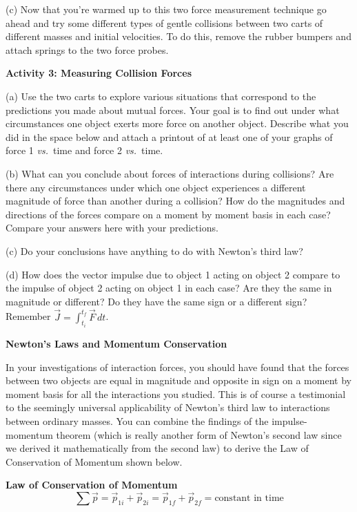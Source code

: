(c) Now that you're warmed up to this two force measurement technique go ahead and
try some different types of gentle collisions between two carts of different
masses and initial velocities. To do this, remove the rubber bumpers and attach springs to the two force probes.

\pagebreak[3]
\textbf{Activity 3: Measuring Collision Forces }

(a) Use the two carts to explore various situations that correspond to the predictions
you made about mutual forces. Your goal is to find out under what circumstances
one object exerts more force on another object. Describe what you did in the
space below and attach a printout of at least one of your graphs of force 1 \textit{vs.}~time and force 2 \textit{vs.}~time.
\answerspace{30mm}

(b) What can you conclude about forces of interactions during collisions? Are there any circumstances under which one object experiences a different magnitude of force
than another during a collision? How do the magnitudes and directions of the
forces compare on a moment by moment basis in each case? 
Compare your answers here with your predictions.
\answerspace{30mm}

(c) Do your conclusions have anything to do with Newton's third law?
\answerspace{20mm}

\pagebreak[2]
(d) How does the vector impulse due to object 1 acting on object 2 compare to
the impulse of object 2 acting on object 1 in each case? Are they the same in
magnitude or different? Do they have the same sign or a different sign? Remember
\( {\vec  J}=\int _{t_{i}}^{t_{f}}{\vec  F}\,dt \).
\answerspace{20mm}

\textbf{Newton's Laws and Momentum Conservation} 

In your investigations of interaction forces, you should have found that the
forces between two objects are equal in magnitude and opposite in sign on a
moment by moment basis for all the interactions you studied. This is of course
a testimonial to the seemingly universal applicability of Newton's third law
to interactions between ordinary masses. You can combine the findings of the
impulse-momentum theorem (which is really another form of Newton's second law
since we derived it mathematically from the second law) to derive the Law of
Conservation of Momentum shown below.

{\par\centering \textbf{Law of Conservation of Momentum}
\[
\sum {\vec  p}={{\vec  p}_{1i}}+{{\vec  p}_{2i}}={{\vec  p}_{1f}}+{{\vec  p}_{2f}}=
\mbox{constant in time}\]
\par}

